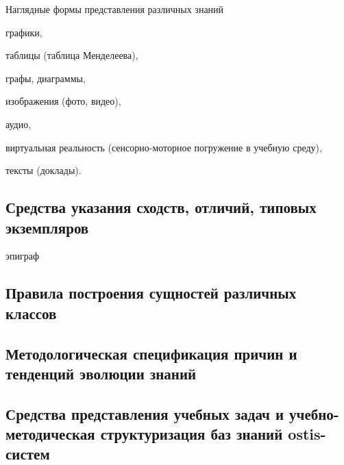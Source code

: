 Наглядные формы представления различных знаний
\begin{textitemize}
	\item графики,
	\item таблицы (таблица Менделеева),
	\item графы, диаграммы,
	\item изображения (фото, видео),
	\item аудио,
	\item виртуальная реальность (сенсорно-моторное погружение в учебную среду),
	\item тексты (доклады).
\end{textitemize}

\newpage
\subsection{Средства указания сходств, отличий, типовых экземпляров}
\label{subsec_means_indicating_similarities_differences_specimens}

\begin{SCn}
	\begin{scnrelfromlist}{эпиграф}
	\end{scnrelfromlist}
\end{SCn}


\newpage
\subsection{Правила построения сущностей различных классов}
\label{subsec_rules_constructing_entities_various_classes}

\newpage
\subsection{Методологическая спецификация причин и тенденций эволюции знаний}
\label{subsec_methodological_specification_causes_trends_evolution_knowledge}

\newpage
\subsection{Средства представления учебных задач и учебно-методическая структуризация баз знаний ostis-систем}
\label{subsec_means_presentation_educational_tasks_educational_methodical_structuring_kb}

